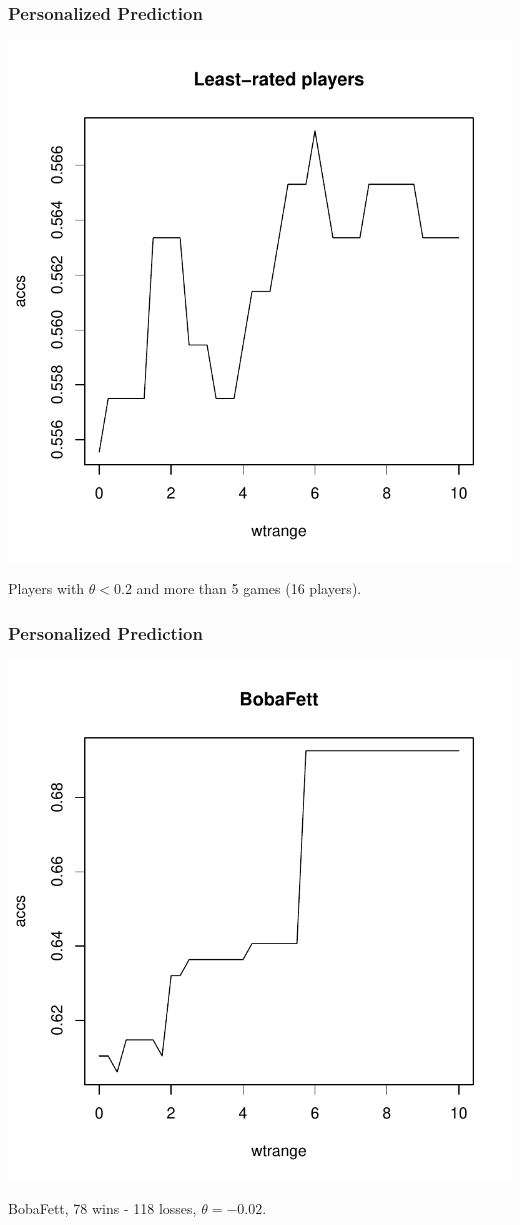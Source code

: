 \documentclass{beamer}
\begin{document}
\begin{frame}
\frametitle{Personalized Prediction}
\begin{center}
\includegraphics[scale = 0.4]{../prediction/personalized_leastrated.pdf}
\end{center}
Players with $\theta < 0.2$ and more than 5 games (16 players).
\end{frame}

\begin{frame}
\frametitle{Personalized Prediction}
\begin{center}
\includegraphics[scale = 0.4]{../prediction/personalized_boba.pdf}
\end{center}
BobaFett, 78 wins - 118 losses, $\theta = -0.02$.
\end{frame}
\end{document}
